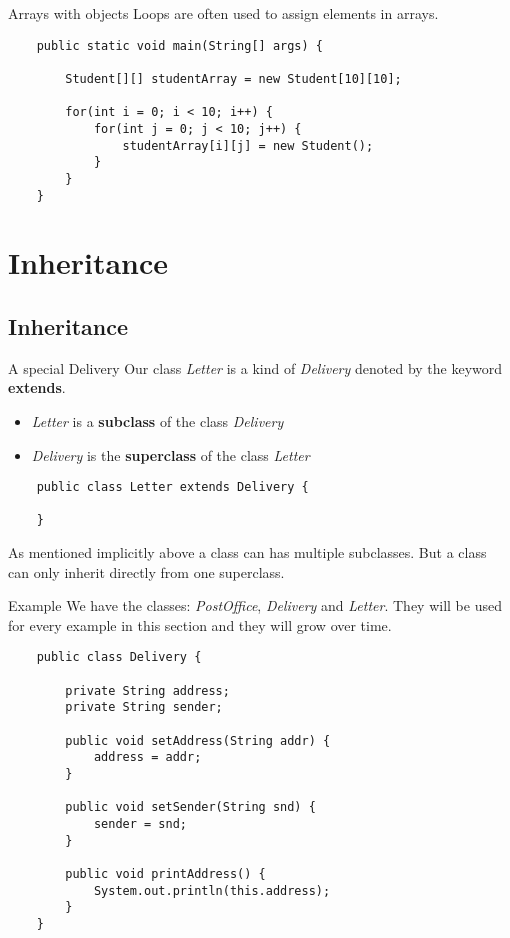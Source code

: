 \begin{frame}[fragile]{Arrays with objects}
    Loops are often used to assign elements in arrays.
    \begin{lstlisting}
    public static void main(String[] args) {

        Student[][] studentArray = new Student[10][10];
        
        for(int i = 0; i < 10; i++) {
            for(int j = 0; j < 10; j++) {
                studentArray[i][j] = new Student();
            }
        }
    } \end{lstlisting}
\end{frame}

\section{Inheritance}
\subsection{Inheritance}


\begin{frame}[fragile]{A special Delivery}
    Our class \emph{Letter} is a kind of \emph{Delivery} denoted by the keyword \textbf{extends}.
    \begin{itemize}
        \item \emph{Letter} is a \textbf{subclass} of the class \emph{Delivery}
        \item \emph{Delivery} is the \textbf{superclass} of the class \emph{Letter}
    \end{itemize}
    \begin{lstlisting}
    public class Letter extends Delivery {
    
    } \end{lstlisting}
    \vfill
    As mentioned implicitly above a class can has multiple subclasses. 
    But a class can only inherit directly from one superclass.
\end{frame}

\begin{frame}[fragile]{Example}
    We have the classes: \emph{PostOffice}, \emph{Delivery} and \emph{Letter}.
    They will be used for every example in this section and they will grow over time.
    \begin{lstlisting}
    public class Delivery {
    
        private String address;
        private String sender;
        
        public void setAddress(String addr) {
            address = addr;
        }
        
        public void setSender(String snd) {
            sender = snd;
        }
        
        public void printAddress() {
            System.out.println(this.address);
        }
    }\end{lstlisting}
\end{frame}

